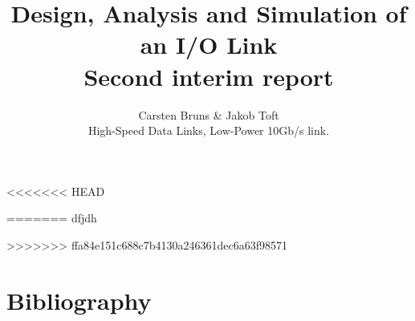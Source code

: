 \documentclass[12pt,journal,compsoc,onecolumn]{IEEEtran}
\begin{document}
%
\title{Design, Analysis and Simulation of an I/O Link\\Second interim report}

\author{Carsten Bruns
        \& Jakob Toft%



\begin{IEEEkeywords}
High-Speed Data Links, Low-Power 10Gb/s link.
\end{IEEEkeywords}}


\maketitle

\IEEEdisplaynotcompsoctitleabstractindextext
\IEEEpeerreviewmaketitle

<<<<<<< HEAD












%
=======
dfjdh\cite{rajesh2011a} %







%
%
%
%
%
%
%

>>>>>>> ffa84e151c688c7b4130a246361dec6a63f98571



\ifCLASSOPTIONcaptionsoff
  \newpage
\fi

\newpage
\section{Bibliography}
{}

\end{document}
